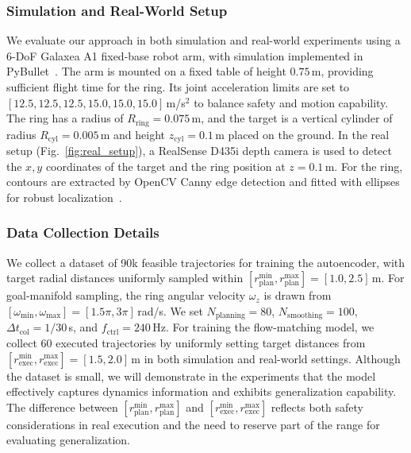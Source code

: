\documentclass[letterpaper, 10 pt, conference]{ieeeconf}  %
\begin{document}
\subsubsection{Simulation and Real-World Setup}
We evaluate our approach in both simulation and real-world experiments using a 6-DoF Galaxea A1 fixed-base robot arm, 
with simulation implemented in PyBullet~\cite{coumans2021pybullet}. 
The arm is mounted on a fixed table of height $0.75$\,m, providing sufficient flight time for the ring. Its joint acceleration limits are set to $[12.5, 12.5, 12.5, 15.0, 15.0, 15.0]$\,m/s$^2$ to balance safety and motion capability. 
The ring has a radius of $R_{\mathrm{ring}} = 0.075$\,m, and the target is a vertical cylinder of radius $R_{\mathrm{cyl}} = 0.005$\,m and height $z_{\mathrm{cyl}} = 0.1$\,m placed on the ground. 
In the real setup (Fig.~\ref{fig:real_setup}), a RealSense D435i depth camera is used to detect the $x,y$ coordinates of the target and the ring position at $z = 0.1$\,m. For the ring, contours are extracted by OpenCV Canny edge detection and fitted with ellipses for robust localization~\cite{opencv_library}.

\subsubsection{Data Collection Details}
We collect a dataset of 90k feasible trajectories for training the autoencoder, 
with target radial distances uniformly sampled within $[r_{\mathrm{plan}}^{\min}, r_{\mathrm{plan}}^{\max}] = [1.0, 2.5]$\,m. 
For goal-manifold sampling, the ring angular velocity $\omega_z$ is drawn from $[\omega_{\min}, \omega_{\max}] = [1.5\pi, 3\pi]$\,rad/s.
We set $N_{\mathrm{planning}}=80$, $N_{\mathrm{smoothing}}=100$, $\Delta t_{\mathrm{col}}=1/30$\,s, and $f_{\mathrm{ctrl}}=240$\,Hz. 
For training the flow-matching model, we collect 60 executed trajectories by uniformly setting target distances from $[r_{\mathrm{exec}}^{\min}, r_{\mathrm{exec}}^{\max}] = [1.5, 2.0]$\,m in both simulation and real-world settings. 
Although the dataset is small, we will demonstrate in the experiments that the model effectively captures dynamics information and exhibits generalization capability. 
The difference between $[r_{\mathrm{plan}}^{\min}, r_{\mathrm{plan}}^{\max}]$ and $[r_{\mathrm{exec}}^{\min}, r_{\mathrm{exec}}^{\max}]$ reflects both safety considerations in real execution and the need to reserve part of the range for evaluating generalization. 
\end{document}
